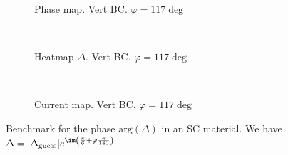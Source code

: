 \documentclass[../main.tex]{subfiles}
\begin{document}
\begin{figure}[H]
\begin{subfigure}{0.4\textwidth}
    \centering
    \hspace{-4cm} %
    
    \caption{Phase map. Vert BC. $\varphi = 117\deg$}
    \label{fig:first}
\end{subfigure}    \\
    \begin{subfigure}{0.4\textwidth}
        \centering
        \hspace{-4cm} %
        
        \caption{Heatmap $\Delta$. Vert BC. $\varphi = 117\deg$}
        \label{fig:first}
    \end{subfigure}    \\
\hspace{0.1\textwidth}
\begin{subfigure}{0.4\textwidth}
    \centering
    
    \caption{Current map. Vert BC. $\varphi = 117 \deg$}
    \label{fig:first}
\end{subfigure}

\caption{Benchmark for the phase $\text{arg}(\Delta)$ in an SC material. We have $\Delta = |\Delta_{\text{guess}}|e^{\im \left(\frac{\pi}{6} + \varphi\frac{\pi}{180}\right)}$}
\end{figure}
\end{document}

